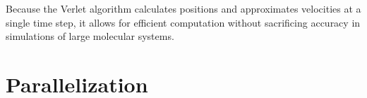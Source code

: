 \documentclass[conference]{IEEEtran}
\begin{document}


Because the Verlet algorithm calculates positions and approximates velocities at a single time step, it allows for efficient computation without sacrificing accuracy in simulations of large molecular systems.


 






\section{Parallelization}





\end{document}
